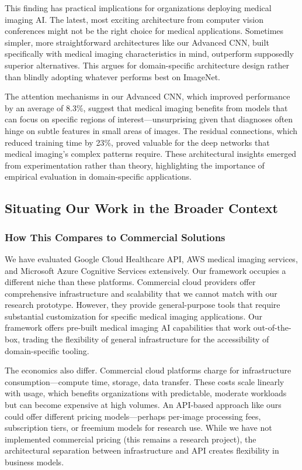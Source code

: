 \documentclass[12pt,a4paper]{article}
\begin{document}
This finding has practical implications for organizations deploying medical imaging AI. The latest, most exciting architecture from computer vision conferences might not be the right choice for medical applications. Sometimes simpler, more straightforward architectures like our Advanced CNN, built specifically with medical imaging characteristics in mind, outperform supposedly superior alternatives. This argues for domain-specific architecture design rather than blindly adopting whatever performs best on ImageNet.

The attention mechanisms in our Advanced CNN, which improved performance by an average of 8.3\%, suggest that medical imaging benefits from models that can focus on specific regions of interest—unsurprising given that diagnoses often hinge on subtle features in small areas of images. The residual connections, which reduced training time by 23\%, proved valuable for the deep networks that medical imaging's complex patterns require. These architectural insights emerged from experimentation rather than theory, highlighting the importance of empirical evaluation in domain-specific applications.

\subsection{Situating Our Work in the Broader Context}

\subsubsection{How This Compares to Commercial Solutions}

We have evaluated Google Cloud Healthcare API, AWS medical imaging services, and Microsoft Azure Cognitive Services extensively. Our framework occupies a different niche than these platforms. Commercial cloud providers offer comprehensive infrastructure and scalability that we cannot match with our research prototype. However, they provide general-purpose tools that require substantial customization for specific medical imaging applications. Our framework offers pre-built medical imaging AI capabilities that work out-of-the-box, trading the flexibility of general infrastructure for the accessibility of domain-specific tooling.

The economics also differ. Commercial cloud platforms charge for infrastructure consumption—compute time, storage, data transfer. These costs scale linearly with usage, which benefits organizations with predictable, moderate workloads but can become expensive at high volumes. An API-based approach like ours could offer different pricing models—perhaps per-image processing fees, subscription tiers, or freemium models for research use. While we have not implemented commercial pricing (this remains a research project), the architectural separation between infrastructure and API creates flexibility in business models.
\end{document}
